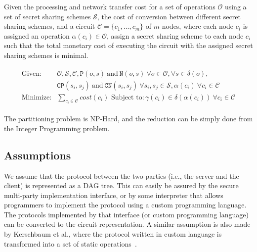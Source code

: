 \documentclass{llncs}
\begin{document}
\begin{definition}
	Given the processing and network transfer cost for a set of operations $\mathcal{O}$ using a set of secret sharing schemes $\mathcal{S}$, the cost of conversion between different secret sharing schemes, and a circuit $\mathcal{C} = \{c_1, \ldots, c_m\}$ of $m$ nodes, where each node $c_i$ is assigned an operation $\alpha(c_i) \in \mathcal{O}$, assign a secret sharing scheme to each node $c_i$ such that the total monetary cost of executing the circuit with the assigned secret sharing schemes is minimal.

\begin{align}
	\begin{split}
	 \text{Given}: 	& \mathcal{O}, \mathcal{S}, \mathcal{C}, 
		 		\mathtt{P}(o, s)~\text{and}~\mathtt{N}(o,s)~\forall o \in \mathcal{O}, \forall s \in \delta(o), \\
				& \mathtt{CP}(s_i, s_j)~\text{and}~\mathtt{CN}(s_i, s_j)~\forall s_i, s_j \in \mathcal{S}, 
				 \alpha(c_i)~\forall c_i \in \mathcal{C} \\
	\text{Minimize}: 	& \sum\limits_{c_i \in \mathcal{C}}{cost(c_i)} 
	\text{~Subject to}: \gamma(c_i) \in \delta(\alpha(c_i)) ~ \forall c_i \in \mathcal{C}
	\end{split}
\end{align}
\end{definition}

The partitioning problem is NP-Hard, and the reduction can be simply done from the Integer Programming problem.

\subsection{Assumptions}
\label{sec:problem:assumptions}

We assume that the protocol between the two parties (i.e., the server and the client) is represented as a DAG tree. This can easily be assured by the secure multi-party implementation interface, or by some interpreter that allows programmers to implement the protocol using a custom programming language. The protocols implemented by that interface (or custom programming language) can be converted to the circuit representation. A similar assumption is also made by Kerschbaum et al., where the protocol written in custom language is transformed into a set of static operations~\cite{cite:kerschbaum2014automatic}. 
\end{document}
